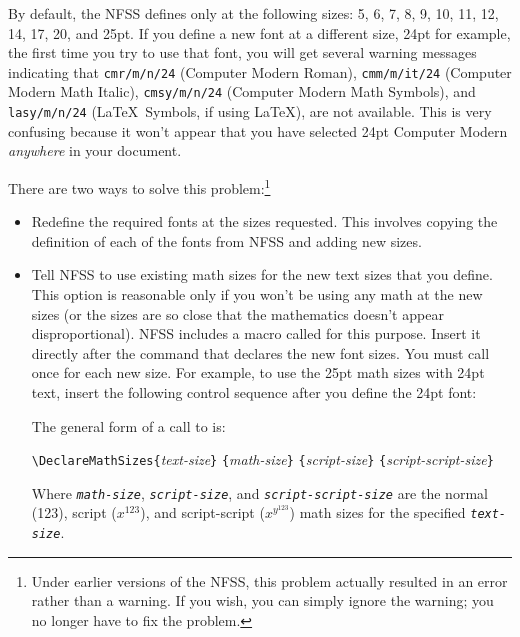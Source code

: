 By default, the NFSS  defines  only 
at the following sizes:
5, 6, 7, 8, 9, 10, 11, 12, 14, 17, 20, and 25pt.  If you define a new
font at a different size, 24pt for example, the first time you
try to use that font, you will get several warning messages indicating
that \texttt{cmr/m/n/24} (Computer Modern Roman),
\texttt{cmm/m/it/24} (Computer Modern Math Italic), 
\texttt{cmsy/m/n/24} (Computer Modern
Math Symbols), and \texttt{lasy/m/n/24} (\LaTeX\ Symbols, if
using \LaTeX), are not available.
This is very confusing because
it won't appear that you have selected 24pt Computer Modern {\em anywhere}
in your document.  

There are two ways to solve this problem:\footnote{Under earlier versions
of the NFSS, this problem actually resulted in an error rather than a warning.
If you wish, you can simply ignore the warning; you no longer have to fix
the problem.}

\begin{itemize}
  \item Redefine the required fonts at the sizes requested.
        This involves copying the definition of each of the fonts
        from NFSS  and adding new sizes.  

  \item Tell NFSS to use existing math sizes for the new text
        sizes that you define.  This
        option is reasonable only if you won't be using any math
        at the new sizes (or the sizes are so close that the mathematics
        doesn't appear disproportional).  NFSS includes a macro called
         for this purpose.  Insert it
        directly after the  command that
        declares the new font sizes.  You must call 
        once for each new size.  For example, to use the 25pt math sizes
        with 24pt text,
        insert the following control sequence
        after you define the 24pt font:

\begin{shortexample}
\end{shortexample}

        The general form of a call to  is:

\begin{ttindent}
\verb|\DeclareMathSizes{|\textit{text-size}\verb|}|%
   \verb|{|\textit{math-size}\verb|}|%
   \verb|{|\textit{script-size}\verb|}|%
   \verb|{|\textit{script-script-size}\verb|}|
\end{ttindent}

        Where \textit{\texttt{math-size}},
        \textit{\texttt{script-size}}, and
        \textit{\texttt{script-script-size}} are the normal (123), 
        script ($x^{123}$), and script-script ($x^{y^{123}}$) math sizes
        for the specified \textit{\texttt{text-size}}.
\end{itemize}

